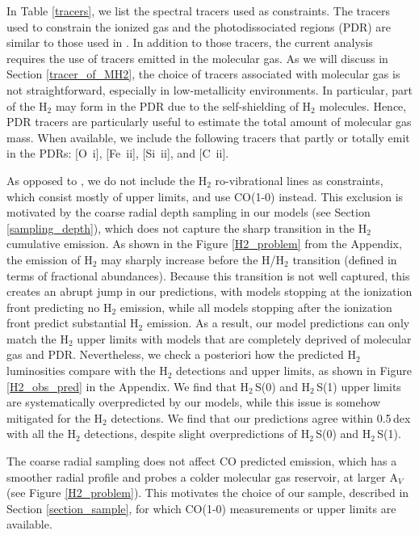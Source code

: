 \documentclass{aa}
\newcommand{\oi}{[O~{\sc i}]}
\newcommand{\cii}{[C~{\sc ii}]}
\newcommand{\feii}{[Fe~{\sc ii}]}
\newcommand{\silii}{[Si~{\sc ii}]}
\begin{document}
In Table \ref{tracers}, we list the spectral tracers used as constraints. The tracers used to constrain the ionized gas and the photodissociated regions (PDR) are similar to those used in \cite{Ramambason2022}. In addition to those tracers, the current analysis requires the use of tracers emitted in the molecular gas. As we will discuss in Section \ref{tracer_of_MH2}, the choice of tracers associated with molecular gas is not straightforward, especially in low-metallicity environments. In particular, part of the H$_2$ may form in the PDR due to the self-shielding of H$_2$ molecules. Hence, PDR tracers are particularly useful to estimate the total amount of molecular gas mass. When available, we include the following tracers that partly or totally emit in the PDRs: \oi, \feii, \silii, and \cii.

As opposed to \cite{Ramambason2022}, we do not include the H$_2$ ro-vibrational lines as constraints, which consist mostly of upper limits, and use CO(1-0) instead. This exclusion is motivated by the coarse radial depth sampling in our models (see Section \ref{sampling_depth}), which does not capture the sharp transition in the H$_2$ cumulative emission. As shown in the Figure \ref{H2_problem} from the Appendix, the emission of H$_2$ may sharply increase before the H/H$_2$ transition (defined in terms of fractional abundances). Because this transition is not well captured, this creates an abrupt jump in our predictions, with models stopping at the ionization front predicting no H$_2$ emission, while all models stopping after the ionization front predict substantial H$_2$ emission. As a result, our model predictions can only match the H$_2$ upper limits with models that are completely deprived of molecular gas and PDR. Nevertheless, we check a posteriori how the predicted H$_2$ luminosities compare with the H$_2$ detections and upper limits, as shown in Figure \ref{H2_obs_pred} in the Appendix. We find that H$_2$\,S(0) and H$_2$\,S(1) upper limits are systematically overpredicted by our models, while this issue is somehow mitigated for the H$_2$ detections. We find that our predictions agree  within 0.5\,dex with all the H$_2$ detections, despite slight overpredictions of H$_2$\,S(0) and H$_2$\,S(1).

The coarse radial sampling does not affect CO predicted emission, which has a smoother radial profile and probes a colder molecular gas reservoir, at larger A$_V$ (see Figure \ref{H2_problem}). This motivates the choice of our sample, described in Section \ref{section_sample}, for which CO(1-0) measurements or upper limits are available. 
\end{document}
